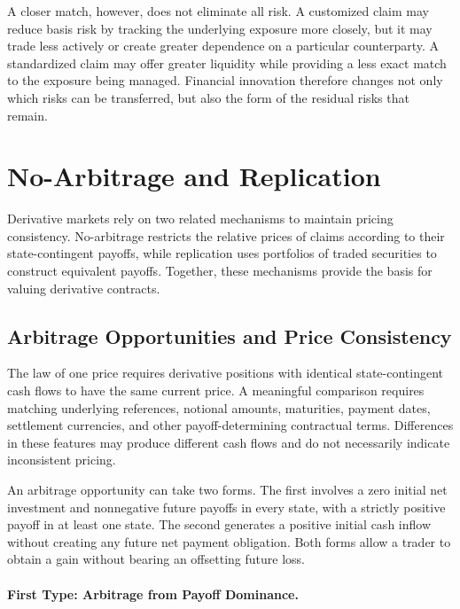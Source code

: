 A closer match, however, does not eliminate all risk. A customized claim may reduce basis risk by tracking the underlying exposure more closely, but it may trade less actively or create greater dependence on a particular counterparty. A standardized claim may offer greater liquidity while providing a less exact match to the exposure being managed. Financial innovation therefore changes not only which risks can be transferred, but also the form of the residual risks that remain.

\section{No-Arbitrage and Replication}

Derivative markets rely on two related mechanisms \cite{BlackScholes1973,Merton1973,HarrisonKreps1979}
to maintain pricing consistency. No-arbitrage
restricts the relative prices of claims according
to their state-contingent payoffs, while replication
uses portfolios of traded securities to construct
equivalent payoffs. Together, these mechanisms
provide the basis for valuing derivative contracts.

\subsection{Arbitrage Opportunities and Price Consistency}

The law of one price requires derivative positions
with identical state-contingent cash flows to have
the same current price. A meaningful comparison
requires matching underlying references, notional
amounts, maturities, payment dates, settlement
currencies, and other payoff-determining contractual
terms. Differences in these features may produce
different cash flows and do not necessarily indicate
inconsistent pricing.

An arbitrage opportunity can take two forms.
The first involves a zero initial net investment
and nonnegative future payoffs in every state,
with a strictly positive payoff in at least one
state. The second generates a positive initial
cash inflow without creating any future net payment
obligation. Both forms allow a trader to obtain
a gain without bearing an offsetting future loss.

\paragraph{First Type: Arbitrage from Payoff Dominance.}

